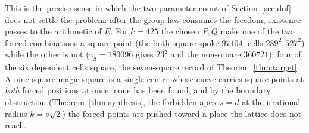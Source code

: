 \documentclass[11pt]{article}
\theoremstyle{definition}
\begin{document}
\noindent This is the precise sense in which the two-parameter count of
Section~\ref{sec:dof} does not settle the problem: after the group law consumes the
freedom, existence passes to the arithmetic of $E$. For $k=425$ the chosen $P,Q$
make one of the two forced combinations a square-point (the both-square spoke
$97104$, cells $289^{2},527^{2}$) while the other is not ($\gamma_3=180096$ gives
$23^{2}$ and the non-square $360721$): four of the six dependent cells square, the
seven-square record of Theorem~\ref{thm:target}. A nine-square magic square is a
single centre whose curve carries square-points at \emph{both} forced positions
at once; none has been found, and by the boundary obstruction
(Theorem~\ref{thm:synthesis}, the forbidden apex $s=d$ at the irrational radius
$k=s\sqrt2$) the forced points are pushed toward a place the lattice does not reach.
\end{document}
